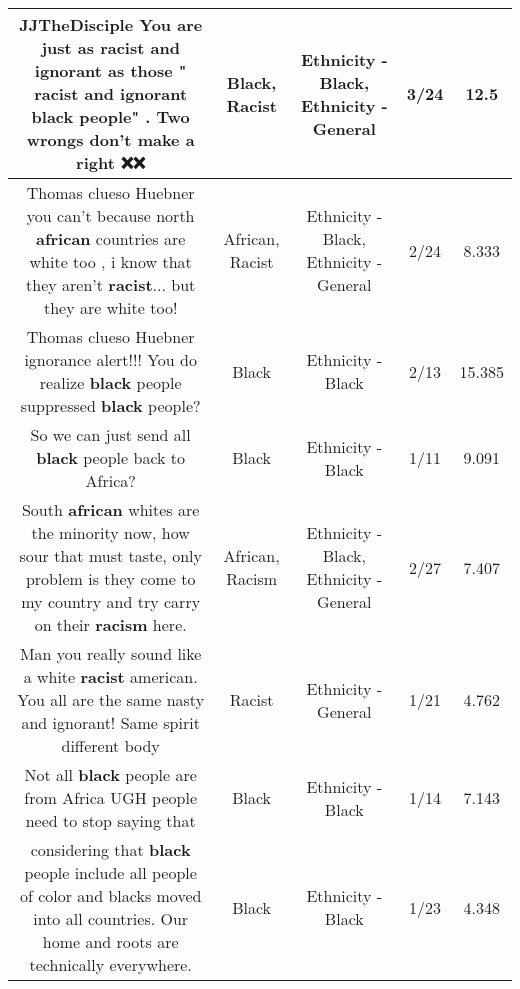 \documentclass[11pt]{article}
\newlength\mylength
\begin{document}
\begin{center}
\begin{longtable}{|C{.65\mylength}|C{.30\mylength}|C{.12\mylength}|C{.12\mylength}|C{.12\mylength}|}
  \small JJTheDisciple You are just as \textbf{racist} and ignorant as those " \textbf{racist} and ignorant \textbf{black} people" . Two wrongs don't make a right ❌❌\normalsize   & Black, Racist & Ethnicity - Black, Ethnicity - General & 3/24 & 12.5 \\  \hline
  \small Thomas clueso Huebner  you can't because north \textbf{african} countries are white too , i know that they aren't \textbf{racist}... but they are white too!\normalsize   & African, Racist & Ethnicity - Black, Ethnicity - General & 2/24 & 8.333 \\  \hline
  \small Thomas clueso Huebner ignorance alert!!! You do realize \textbf{black} people suppressed \textbf{black} people?\normalsize   & Black & Ethnicity - Black & 2/13 & 15.385 \\  \hline
  \small So we can just send all \textbf{black} people back to Africa?\normalsize   & Black & Ethnicity - Black & 1/11 & 9.091 \\  \hline
  \small South \textbf{african} whites are the minority now, how sour that must taste, only problem is they come to my country and try carry on their \textbf{racism} here.\normalsize   & African, Racism & Ethnicity - Black, Ethnicity - General & 2/27 & 7.407 \\  \hline
  \small Man you really sound like a white \textbf{racist} american. You all are the same nasty and ignorant! Same spirit different body\normalsize   & Racist & Ethnicity - General & 1/21 & 4.762 \\  \hline
  \small Not all \textbf{black} people are from Africa UGH people need to stop saying that\normalsize   & Black & Ethnicity - Black & 1/14 & 7.143 \\  \hline
  \small {} considering that \textbf{black} people include all people of color and blacks moved into all countries. Our home and roots are technically everywhere.\normalsize   & Black & Ethnicity - Black & 1/23 & 4.348 \\  \hline

\end{longtable}
\end{center}
\end{document}
